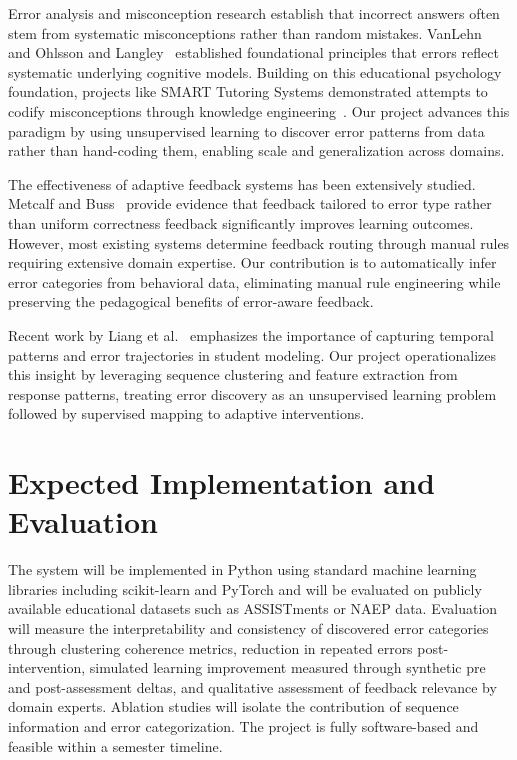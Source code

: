 \documentclass[conference]{IEEEtran}
\begin{document}
Error analysis and misconception research establish that incorrect answers often stem from systematic misconceptions rather than random mistakes. VanLehn~\cite{vanlehn1999} and Ohlsson and Langley~\cite{ohlsson1985} established foundational principles that errors reflect systematic underlying cognitive models. Building on this educational psychology foundation, projects like SMART Tutoring Systems demonstrated attempts to codify misconceptions through knowledge engineering~\cite{koedinger2012}. Our project advances this paradigm by using unsupervised learning to discover error patterns from data rather than hand-coding them, enabling scale and generalization across domains.

The effectiveness of adaptive feedback systems has been extensively studied. Metcalf and Buss~\cite{metcalf2020} provide evidence that feedback tailored to error type rather than uniform correctness feedback significantly improves learning outcomes. However, most existing systems determine feedback routing through manual rules requiring extensive domain expertise. Our contribution is to automatically infer error categories from behavioral data, eliminating manual rule engineering while preserving the pedagogical benefits of error-aware feedback.

Recent work by Liang et al.~\cite{liang2022} emphasizes the importance of capturing temporal patterns and error trajectories in student modeling. Our project operationalizes this insight by leveraging sequence clustering and feature extraction from response patterns, treating error discovery as an unsupervised learning problem followed by supervised mapping to adaptive interventions.

\section{Expected Implementation and Evaluation}

The system will be implemented in Python using standard machine learning libraries including scikit-learn and PyTorch and will be evaluated on publicly available educational datasets such as ASSISTments or NAEP data. Evaluation will measure the interpretability and consistency of discovered error categories through clustering coherence metrics, reduction in repeated errors post-intervention, simulated learning improvement measured through synthetic pre and post-assessment deltas, and qualitative assessment of feedback relevance by domain experts. Ablation studies will isolate the contribution of sequence information and error categorization. The project is fully software-based and feasible within a semester timeline.
\end{document}
